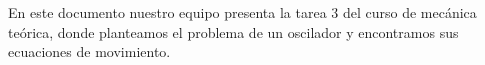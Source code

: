 
\noindent 				%
En este documento nuestro equipo presenta la tarea 3 del curso de mecánica teórica, donde planteamos 
el problema de un oscilador y encontramos sus ecuaciones de movimiento.